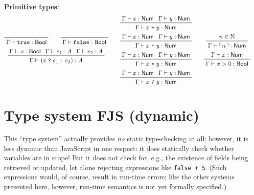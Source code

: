 \documentclass[11pt]{article}
\begin{document}
\textbf{Primitive types}: \begin{gather*}
\begin{gathered}
	\prftree{}{\Gamma \vdash \texttt{true} : \textsf{Bool}} \qquad
	\prftree{}{\Gamma \vdash \texttt{false}: \textsf{Bool}} \\
	\prftree{\Gamma \vdash x : \textsf{Bool}}{\Gamma \vdash e_1 : A}{\Gamma \vdash e_2 : A}{\Gamma \vdash (x\;\texttt{?}\;e_1\;\texttt{:}\;e_2) : A}
\end{gathered}
	\qquad
\begin{gathered}
	\prftree{\Gamma \vdash x : \textsf{Num}}{\Gamma \vdash y : \textsf{Num}}{\Gamma \vdash x\;\texttt{+}\;y : \textsf{Num}} \\
	\prftree{\Gamma \vdash x : \textsf{Num}}{\Gamma \vdash y : \textsf{Num}}{\Gamma \vdash x\;\texttt{-}\;y : \textsf{Num}} \\
	\prftree{\Gamma \vdash x : \textsf{Num}}{\Gamma \vdash y : \textsf{Num}}{\Gamma \vdash x\;\texttt{*}\;y : \textsf{Num}} \\
	\prftree{\Gamma \vdash x : \textsf{Num}}{\Gamma \vdash y : \textsf{Num}}{\Gamma \vdash x\;\texttt{/}\;y : \textsf{Num}}
\end{gathered}
	\qquad
\begin{gathered}
	\prftree{n \in \mathbb{N}}{\Gamma \vdash \ulcorner n \urcorner : \textsf{Num}} \\
	\prftree{\Gamma \vdash x : \textsf{Num}}{\Gamma \vdash x > 0 : \textsf{Bool}}
\end{gathered}
\end{gather*}

\section{Type system FJS (dynamic)}

This ``type system'' actually provides \textit{no} static type-checking at all; however, it is less dynamic than JavaScript in one respect: it does statically check whether variables are in scope! But it does not check for, e.g., the existence of fields being retrieved or updated, let alone rejecting expressions like \texttt{false + 5}. (Such expressions would, of course, result in run-time errors; like the other systems presented here, however, run-time semantics is not yet formally specified.)
\end{document}
